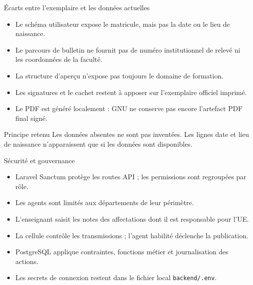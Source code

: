 \documentclass[aspectratio=169,12pt]{beamer}
\begin{document}
\begin{frame}{Écarts entre l’exemplaire et les données actuelles}
  \begin{itemize}
    \item Le schéma utilisateur expose le matricule, mais pas la date ou le lieu de naissance.
    \item Le parcours de bulletin ne fournit pas de numéro institutionnel de relevé ni les coordonnées de la faculté.
    \item La structure d’aperçu n’expose pas toujours le domaine de formation.
    \item Les signatures et le cachet restent à apposer sur l’exemplaire officiel imprimé.
    \item Le PDF est généré localement : GNU ne conserve pas encore l’artefact PDF final signé.
  \end{itemize}
  \begin{alertblock}{Principe retenu}
    Les données absentes ne sont pas inventées. Les lignes date et lieu de naissance n’apparaissent que si les données sont disponibles.
  \end{alertblock}
\end{frame}

\begin{frame}{Sécurité et gouvernance}
  \begin{itemize}
    \item Laravel Sanctum protège les routes API ; les permissions sont regroupées par rôle.
    \item Les agents sont limités aux départements de leur périmètre.
    \item L’enseignant saisit les notes des affectations dont il est responsable pour l’UE.
    \item La cellule contrôle les transmissions ; l’agent habilité déclenche la publication.
    \item PostgreSQL applique contraintes, fonctions métier et journalisation des actions.
    \item Les secrets de connexion restent dans le fichier local \texttt{backend/.env}.
  \end{itemize}
\end{frame}
\end{document}
